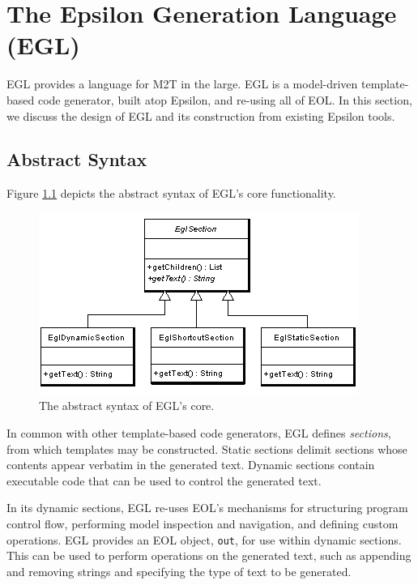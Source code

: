 \chapter{The Epsilon Generation Language (EGL)}
\label{sec:EGL}

EGL provides a language for M2T in the large.   EGL is a model-driven
template-based code generator, built atop Epsilon, and re-using all
of EOL. In this section, we discuss the  design of EGL and its
construction from existing Epsilon tools.

\section{Abstract Syntax}
Figure \ref{fig:abstractsyntax} depicts the abstract syntax of EGL's core functionality.

\begin{figure}[htbp]
  \begin{center}
    \leavevmode
    \includegraphics[scale=0.80]{images/EglAbstractSyntax.png}
  \end{center}
  \caption{The abstract syntax of EGL's core.}
  \label{fig:abstractsyntax}
\end{figure}

In common with other template-based code generators, EGL defines
\emph{sections}, from which templates may be constructed. Static
sections delimit sections whose contents appear verbatim in the
generated text. Dynamic sections contain executable code that can be
used to control the generated text.

In its dynamic sections, EGL re-uses EOL's mechanisms for structuring
program control flow, performing model inspection and navigation, and
defining custom operations.  EGL provides an EOL object, \verb|out|,
for use within dynamic sections.  This can be used to perform
operations on the generated text, such as appending and removing
strings and specifying the type of text to be generated.

